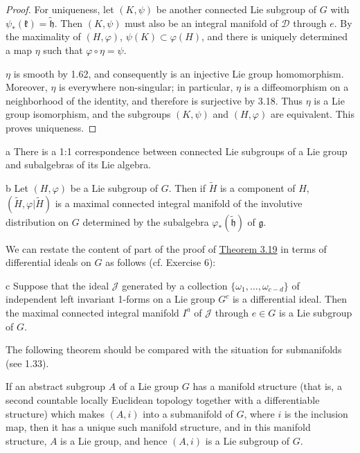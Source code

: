 \begin{proof}
For uniqueness, let $(K,\psi)$ be another connected Lie subgroup of $G$ with $\psi_{*}(\mathfrak{k})=\tilde{\mathfrak{h}}$. Then $(K,\psi)$ must also be an integral manifold of $\mathcal{D}$ through $e$. By the maximality of $(H,\varphi)$, $\psi(K)\subset\varphi(H)$, and there is uniquely determined a map $\eta$ such that $\varphi\circ\eta=\psi$.

\begin{center}
\end{center}

$\eta$ is smooth by 1.62, and consequently is an injective Lie group homomorphism. Moreover, $\eta$ is everywhere non-singular; in particular, $\eta$ is a diffeomorphism on a neighborhood of the identity, and therefore is surjective by 3.18. Thus $\eta$ is a Lie group isomorphism, and the subgroups $(K,\psi)$ and $(H,\varphi)$ are equivalent. This proves uniqueness.

\end{proof}

\begin{corollary*}{a}
There is a 1:1 correspondence between connected Lie subgroups of a Lie group and subalgebras of its Lie algebra.
\end{corollary*}

\begin{corollary*}{b}
Let $(H,\varphi)$ be a Lie subgroup of $G$. Then if $\tilde{H}$ is a component of $H$, $(\tilde{H},\varphi|\tilde{H})$ is a maximal connected integral manifold of the involutive distribution on $G$ determined by the subalgebra $\varphi_{*}(\tilde{\mathfrak{h}})$ of $\mathfrak{g}$.
\end{corollary*}

We can restate the content of part of the proof of \hyperref[thm:3.19]{Theorem 3.19} in terms of differential ideals on $G$ as follows (cf. Exercise 6):

\begin{corollary*}{c}
Suppose that the ideal $\mathcal{J}$ generated by a collection $\{\omega_1, \ldots, \omega_{c-d}\}$ of independent left invariant 1-forms on a Lie group $G^c$ is a differential ideal. Then the maximal connected integral manifold $I^a$ of $\mathcal{J}$ through $e \in G$ is a Lie subgroup of $G$.
\end{corollary*}

The following theorem should be compared with the situation for submanifolds (see 1.33).

\begin{theorem}\label{thm:3.20}
If an abstract subgroup $A$ of a Lie group $G$ has a manifold structure (that is, a second countable locally Euclidean topology together with a differentiable structure) which makes $(A,i)$ into a submanifold of $G$, where $i$ is the inclusion map, then it has a unique such manifold structure, and in this manifold structure, $A$ is a Lie group, and hence $(A,i)$ is a Lie subgroup of $G$.

\end{theorem}

